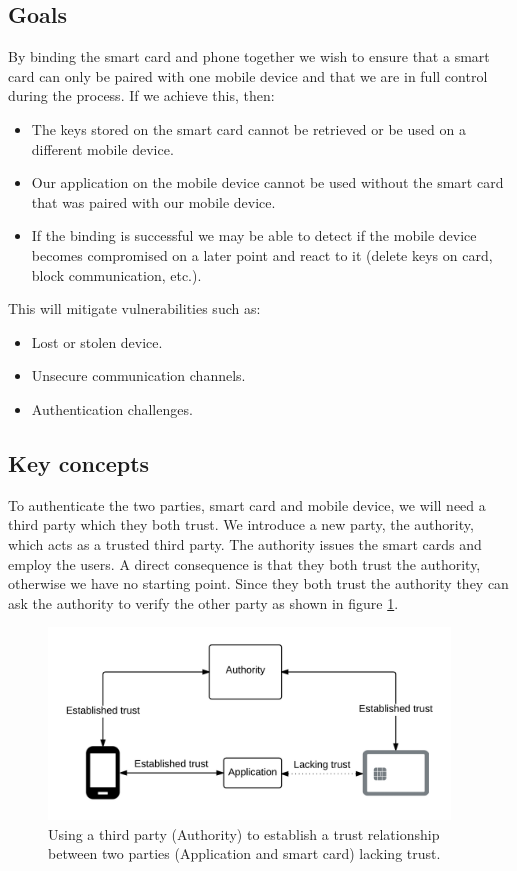 \subsection{Goals}
By binding the smart card and phone together we wish to ensure that a smart card can only be paired with one mobile device and that we are in full control during the process. If we achieve this, then:
\begin{itemize}
  \item The keys stored on the smart card cannot be retrieved or be used on a different mobile device.
  \item Our application on the mobile device cannot be used without the smart card that was paired with our mobile device.
  \item If the binding is successful we may be able to detect if the mobile device becomes compromised on a later point and react to it (delete keys on card, block communication, etc.).
\end{itemize}

This will mitigate vulnerabilities such as:
\begin{itemize}
  \item Lost or stolen device.
  \item Unsecure communication channels.
  \item Authentication challenges.
\end{itemize}

\subsection{Key concepts}
To authenticate the two parties, smart card and mobile device, we will need a third party which they both trust. We introduce a new party, the authority, which acts as a trusted third party. The authority issues the smart cards and employ the users. A direct consequence is that they both trust the authority, otherwise we have no starting point. Since they both trust the authority they can ask the authority to verify the other party as shown in figure \ref{fig:standardAuth}.

\begin{figure}[h!]
  \captionsetup{justification=centering,margin=1.5cm}
  \caption{Using a third party (Authority) to establish a trust relationship between two parties (Application and smart card) lacking trust.}
  \label{fig:standardAuth}
  \centering
    \includegraphics[width=0.95\textwidth]{images/standardAuth2.png}
\end{figure}

